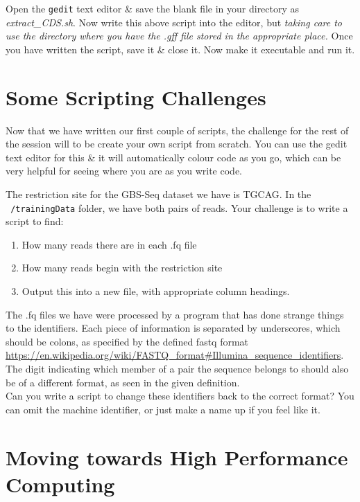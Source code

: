 \begin{steps}
Open the \texttt{gedit} text editor \& save the blank file in your directory as \textit{extract\_CDS.sh}.
Now write this above script into the editor, but \textit{taking care to use the directory where you have the .gff file stored in the appropriate place.}
Once you have written the script, save it \& close it.
Now make it executable and run it.\\
\end{steps}


\section{Some Scripting Challenges}
Now that we have written our first couple of scripts, the challenge for the rest of the session will to be create your own script from scratch.
You can use the gedit text editor for this \& it will automatically colour code as you go, which can be very helpful for seeing where you are as you write code.

\begin{advanced}
The restriction site for the GBS-Seq dataset we have is TGCAG.
In the \texttt{~/trainingData} folder, we have both pairs of reads.
Your challenge is to write a script to find:
\begin{enumerate}
\item How many reads there are in each .fq file
\item How many reads begin with the restriction site
\item Output this into a new file, with appropriate column headings. \\
\end{enumerate}

The .fq files we have were processed by a program that has done strange things to the identifiers.
Each piece of information is separated by underscores, which should be colons, as specified by the defined fastq format \url{https://en.wikipedia.org/wiki/FASTQ\_format#Illumina\_sequence\_identifiers}.
The digit indicating which member of a pair the sequence belongs to should also be of a different format, as seen in the given definition.\\

Can you write a script to change these identifiers back to the correct format? 
You can omit the machine identifier, or just make a name up if you feel like it.
\end{advanced}

\section{Moving towards High Performance Computing}
